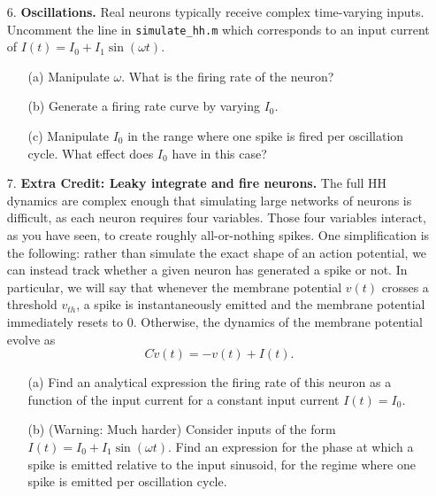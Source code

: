\documentclass{article}
\begin{document}
\begin{itemize}
\item[]
\item[6.] \textbf{Oscillations.}
Real neurons typically receive complex time-varying inputs. Uncomment the line in  \verb|simulate_hh.m| which corresponds to an input current of $I(t)=I_0 + I_1\sin(\omega t)$.
\begin{itemize}
\item[(a)]  Manipulate $\omega$. What is the firing rate of the neuron?
\item[(b)] Generate a firing rate curve by varying $I_0$.
\item[(c)]  Manipulate $I_0$ in the range where one spike is fired per oscillation cycle. What effect does $I_0$ have in this case? 
\end{itemize}


\item[]
\item[7.] \textbf{Extra Credit: Leaky integrate and fire neurons.} The full HH dynamics are complex enough that simulating large networks of neurons is difficult, as each neuron requires four variables. Those four variables interact, as you have seen, to create roughly all-or-nothing spikes. One simplification is the following: rather than simulate the exact shape of an action potential, we can instead track whether a given neuron has generated a spike or not. In particular, we will say that whenever the membrane potential $v(t)$ crosses a threshold $v_{th}$, a spike is instantaneously emitted and the membrane potential immediately resets to $0$. Otherwise, the dynamics of the membrane potential evolve as 
\[ C \dot v(t) = -v(t)+I(t).\]
\begin{itemize}
\item[(a)] Find an analytical expression the firing rate of this neuron as a function of the input current for a constant input current $I(t)=I_0$. 
\item[(b)] (Warning: Much harder) Consider inputs of the form $I(t) = I_0 + I_1\sin(\omega t)$. Find an expression for the phase at which a spike is emitted relative to the input sinusoid, for the regime where one spike is emitted per oscillation cycle.
\end{itemize}
\end{itemize}
 
\end{document}
